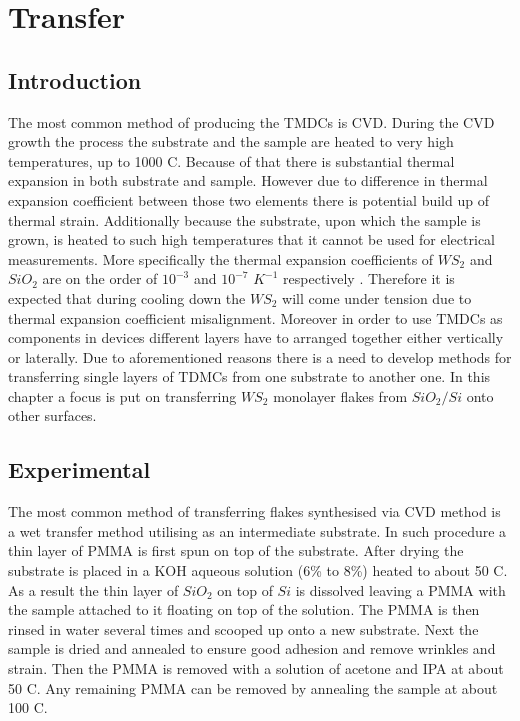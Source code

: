 \chapter{Transfer}
\section{Introduction}
		The most common method of producing the TMDCs is CVD. During the CVD growth the process the substrate and the sample are heated to very high temperatures, up to 1000 {\degree}C. Because of that there is substantial thermal expansion in both substrate and sample. However due to difference in thermal expansion coefficient between those two elements there is potential build up of thermal strain. Additionally because the substrate, upon which the sample is grown, is heated to such high temperatures that it cannot be used for electrical measurements. More specifically the thermal expansion coefficients of $WS_2$ and $SiO_2$ are on the order of $10^{-3}$ and $10^{-7}$ $K^{-1}$ respectively \cite{Hu2018}\cite{Tada2000}. Therefore it is expected that during cooling down the $WS_2$ will come under tension due to thermal expansion coefficient misalignment. Moreover in order to use TMDCs as components in devices different layers have to arranged together either vertically or laterally. Due to aforementioned reasons there is a need to develop methods for transferring single layers of TDMCs from one substrate to another one. In this chapter a focus is put on transferring $WS_2$ monolayer flakes from $SiO_2/Si$ onto other surfaces.
		
\section{Experimental}
		
	The most common method of transferring flakes synthesised via CVD method is a wet transfer method utilising as an intermediate substrate. In such procedure a thin layer of PMMA is first spun on top of the substrate. After drying the substrate is placed in a KOH aqueous solution (6\% to 8\%) heated to about 50 {\degree}C. As a result the thin layer of $SiO_2$ on top of $Si$ is dissolved leaving a PMMA with the sample attached to it floating on top of the solution. The PMMA is then rinsed in water several times and scooped up onto a new substrate. Next the sample is dried and annealed to ensure good adhesion and remove wrinkles and strain. Then the PMMA is removed with a solution of acetone and IPA at about 50 {\degree}C. Any remaining PMMA can be removed by annealing the sample at about 100 {\degree}C.  
		
